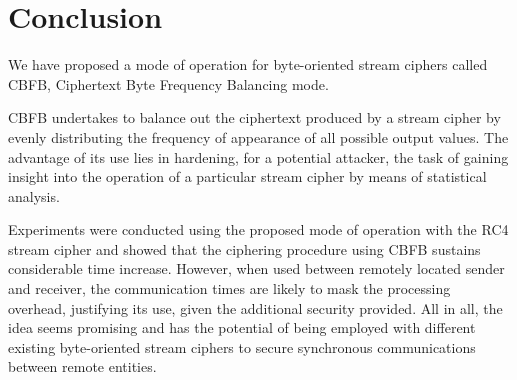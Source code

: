 \documentclass[conference]{IEEEtran}
\begin{document}
%





\section{Conclusion}

We have proposed a mode of operation for byte-oriented stream ciphers called CBFB, Ciphertext Byte Frequency Balancing mode.

CBFB undertakes to balance out the ciphertext produced by a stream cipher by evenly distributing the frequency of appearance of all possible output values. The advantage of its use lies in hardening, for a potential attacker, the task of gaining insight into the operation of a particular stream cipher by means of statistical analysis.

Experiments were conducted using the proposed mode of operation with the RC4 stream cipher and showed that the ciphering procedure using CBFB sustains considerable time increase. However, when used between remotely located sender and receiver, the communication times are likely to mask the processing overhead, justifying its use, given the additional security provided. All in all, the idea seems promising and has the potential of being employed with different existing byte-oriented stream ciphers to secure synchronous communications between remote entities. 
\end{document}
